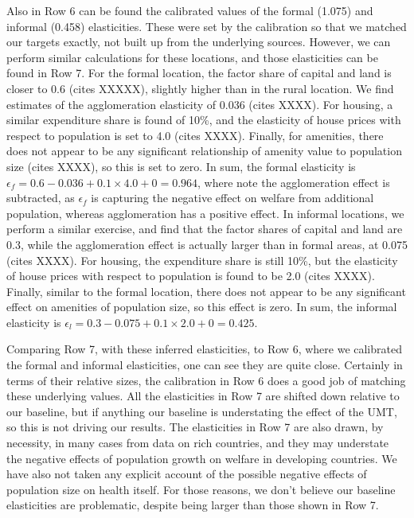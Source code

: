 \documentclass[10pt]{article}
\begin{document}
Also in Row 6 can be found the calibrated values of the formal (1.075) and informal (0.458) elasticities. These were set by the calibration so that we matched our targets exactly, not built up from the underlying sources. However, we can perform similar calculations for these locations, and those elasticities can be found in Row 7. For the formal location, the factor share of capital and land is closer to 0.6 (cites XXXXX), slightly higher than in the rural location. We find estimates of the agglomeration elasticity of 0.036 (cites XXXX). For housing, a similar expenditure share is found of 10\%, and the elasticity of house prices with respect to population is set to 4.0 (cites XXXX). Finally, for amenities, there does not appear to be any significant relationship of amenity value to population size (cites XXXX), so this is set to zero. In sum, the formal elasticity is $\epsilon_f = 0.6 - 0.036 + 0.1\times 4.0 + 0 = 0.964$, where note the agglomeration effect is subtracted, as $\epsilon_f$ is capturing the negative effect on welfare from additional population, whereas agglomeration has a positive effect. In informal locations, we perform a similar exercise, and find that the factor shares of capital and land are 0.3, while the agglomeration effect is actually larger than in formal areas, at 0.075 (cites XXXX). For housing, the expenditure share is still 10\%, but the elasticity of house prices with respect to population is found to be 2.0 (cites XXXX). Finally, similar to the formal location, there does not appear to be any significant effect on amenities of population size, so this effect is zero. In sum, the informal elasticity is $\epsilon_l = 0.3 - 0.075 + 0.1 \times 2.0 + 0 = 0.425$.

Comparing Row 7, with these inferred elasticities, to Row 6, where we calibrated the formal and informal elasticities, one can see they are quite close. Certainly in terms of their relative sizes, the calibration in Row 6 does a good job of matching these underlying values. All the elasticities in Row 7 are shifted down relative to our baseline, but if anything our baseline is understating the effect of the UMT, so this is not driving our results. The elasticities in Row 7 are also drawn, by necessity, in many cases from data on rich countries, and they may understate the negative effects of population growth on welfare in developing countries. We have also not taken any explicit account of the possible negative effects of population size on health itself. For those reasons, we don't believe our baseline elasticities are problematic, despite being larger than those shown in Row 7.
\end{document}
